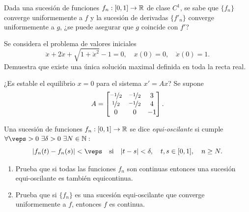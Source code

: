 \documentclass[12pt]{article}
\begin{document}
    \begin{ejercicio}
        Dada una sucesión de funciones $f_n : [0, 1] \to \mathbb{R}$ de clase $C^1$, se sabe que $\{f_n\}$ converge uniformemente a $f$ y la sucesión de derivadas $\{f'_n\}$ converge uniformemente a $g$, ¿se puede asegurar que $g$ coincide con $f'$?
    \end{ejercicio}

    \begin{ejercicio}
        Se considera el problema de valores iniciales
        \[ \ddot{x} + 2\dot{x} + \sqrt{1 + \dot{x}^2} - 1 = 0, \quad x(0) = 0, \quad \dot{x}(0) = 1. \]
        Demuestra que existe una única solución maximal definida en toda la recta real.
    \end{ejercicio}

    \begin{ejercicio}
        ¿Es estable el equilibrio $x = 0$ para el sistema $x' = Ax$? Se supone
        \[ A = \begin{bmatrix} \nicefrac{-1}{2} & \nicefrac{-1}{2} & 3 \\ \nicefrac{1}{2} & \nicefrac{-1}{2} & 4 \\ 0 & 0 & -1 \end{bmatrix}. \]
    \end{ejercicio}

    \begin{ejercicio}
        Una sucesión de funciones $f_n : [0, 1] \to \mathbb{R}$ se dice \textit{equi-oscilante} si cumple $\forall \veps > 0 \ \exists \delta > 0 \ \exists N \in \bb{N} :$
        \[ |f_n(t) - f_n(s)| < \veps \quad \text{si} \quad |t - s| < \delta, \quad t, s \in [0, 1], \quad n \geq N. \]
        \begin{enumerate}[label=\alph*)]
            \item Prueba que si todas las funciones $f_n$ son continuas entonces una sucesión equi-oscilante es también equicontinua.
            \item Prueba que si $\{f_n\}$ es una sucesión equi-oscilante que converge uniformemente a $f$, entonces $f$ es continua.
        \end{enumerate}
    \end{ejercicio}

    \newpage
    \setcounter{ejercicio}{0} %
\end{document}
